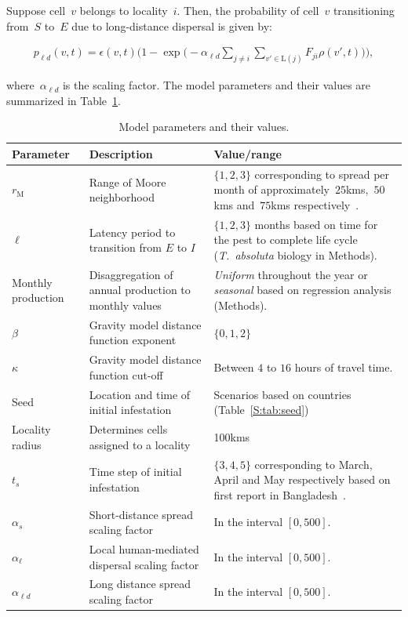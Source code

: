 \documentclass[11pt]{article}
\newcommand{\tuta}{\emph{T.~absoluta}}
\newcommand{\infest}{\rho}
\newcommand{\suitable}{\epsilon}
\newcommand{\pld}{p_{\ell d}}
\newcommand{\asd}{\alpha_s}
\newcommand{\afm}{\alpha_{\ell}}
\newcommand{\ald}{\alpha_{\ell d}}
\newcommand{\locality}{\mathrm{L}}
\newcommand{\mooreRange}{r_\mathrm{M}}
\theoremstyle{definition}
\begin{document}
Suppose cell~$v$ belongs to locality~$i$. Then, the probability of cell~$v$
transitioning from~$S$ to~$E$ due to long-distance dispersal is given by:
\begin{linenomath}
\begin{align}\label{eqn:plocal}
    \pld(v,t)=\suitable(v,t)\bigg(1-
    \exp\Big(-\ald\sum_{j\ne i}\sum_{v'\in\locality(j)}F_{ji}\infest(v',t)\Big)\bigg),
\end{align}
\end{linenomath}
where~$\ald$ is the scaling factor.
The model parameters and their values are summarized in
Table~\ref{tab:param}. 
\begin{table}[t]
\caption{Model parameters and their values.\label{tab:param}}
    \centering
	\small
{} %
    \begin{tabular}{p{}p{}p{}}
		\hline		
		Parameter & Description & Value/range \\
\hline		
\hline
$\mooreRange$ & Range of Moore neighborhood & $\{1,2,3\}$ corresponding to
spread per month of 
approximately~$25$kms,~$50$kms and~$75$kms
respectively~\cite{guimapi2016modeling,martins2018assessing}. \\
$\ell$ & Latency period to transition from $E$ to $I$ & $\{1,2,3\}$ months
based on time for the pest to complete life cycle (\tuta{} biology in
Methods). \\
Monthly production & Disaggregation of annual production to monthly values
& \emph{Uniform} throughout the year or \emph{seasonal} based on regression
analysis (Methods). \\
$\beta$ & Gravity model distance function exponent & $\{0,1,2\}$ \\
$\kappa$ & Gravity model distance function cut-off & Between $4$ to $16$ hours
of travel time. \\
Seed & Location and time of initial infestation & Scenarios based on
countries (Table~\ref{S:tab:seed})\\
Locality radius & Determines cells assigned to a locality & 100kms \\\hline
$t_s$ & Time step of initial infestation & $\{3,4,5\}$ corresponding
to March, April and May respectively based on first report in
Bangladesh~\cite{hossain2016first}. \\
$\asd$ & Short-distance spread scaling factor & In the interval $[0,500]$.\\
$\afm$ & Local human-mediated dispersal scaling factor & In the interval $[0,500]$.\\
$\ald$ & Long distance spread scaling factor & In the interval $[0,500]$.\\
\hline
\end{tabular}
\end{table}
\end{document}
